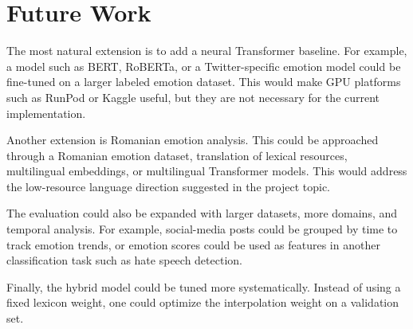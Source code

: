 \section{Future Work}

The most natural extension is to add a neural Transformer baseline. For example, a model such as BERT, RoBERTa, or a Twitter-specific emotion model could be fine-tuned on a larger labeled emotion dataset. This would make GPU platforms such as RunPod or Kaggle useful, but they are not necessary for the current implementation.

Another extension is Romanian emotion analysis. This could be approached through a Romanian emotion dataset, translation of lexical resources, multilingual embeddings, or multilingual Transformer models. This would address the low-resource language direction suggested in the project topic.

The evaluation could also be expanded with larger datasets, more domains, and temporal analysis. For example, social-media posts could be grouped by time to track emotion trends, or emotion scores could be used as features in another classification task such as hate speech detection.

Finally, the hybrid model could be tuned more systematically. Instead of using a fixed lexicon weight, one could optimize the interpolation weight on a validation set.
